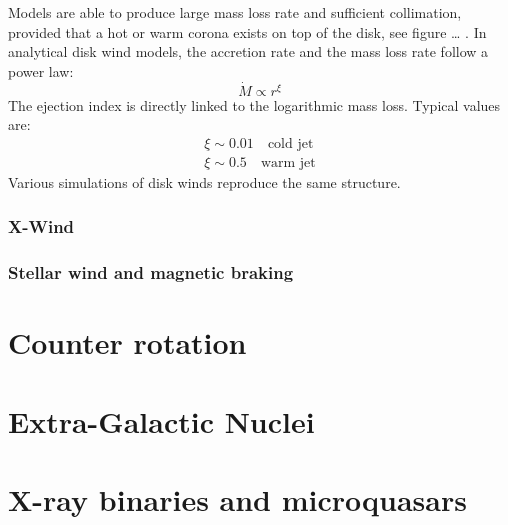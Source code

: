 \documentclass[10pt,a4paper,english,draft]{article}
\begin{document}
Models are able to produce large mass loss rate and sufficient collimation, provided that a hot or warm corona exists on top of the disk, see figure … . In analytical disk wind models, the accretion rate and the mass loss rate follow a power law:
\begin{equation}
  \dot{M} \propto r^\xi
\end{equation}
The ejection index is directly linked to the logarithmic mass loss. Typical values are:
\begin{align}
  \xi \sim 0.01 \quad \textrm{cold jet} \\
  \xi \sim 0.5 \quad \textrm{warm jet}
\end{align}
Various simulations of disk winds reproduce the same structure.
\subsubsection{X-Wind}

\subsubsection{Stellar wind and magnetic braking}

\section{Counter rotation}
\label{sec:counter_rotation}



\section{Extra-Galactic Nuclei}
\section{X-ray binaries and microquasars}

\appendix

\makeatletter
\def\@seccntformat#1{Appendix~\csname the#1\endcsname:\quad}
\makeatother

\newpage




\listoffixmes
\end{document}
